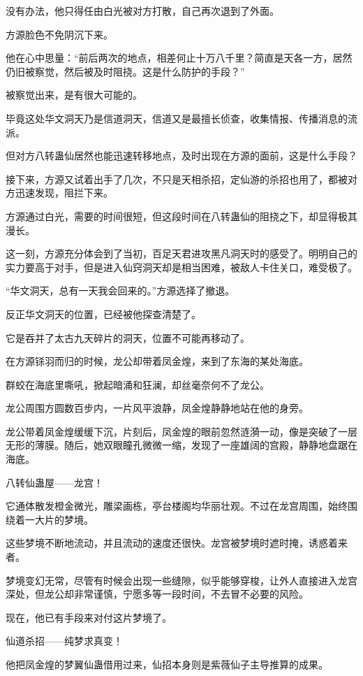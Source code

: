 \begin{this_body}
没有办法，他只得任由白光被对方打散，自己再次退到了外面。

方源脸色不免阴沉下来。

他在心中思量：“前后两次的地点，相差何止十万八千里？简直是天各一方，居然仍旧被察觉，然后被及时阻挠。这是什么防护的手段？”

被察觉出来，是有很大可能的。

毕竟这处华文洞天乃是信道洞天，信道又是最擅长侦查，收集情报、传播消息的流派。

但对方八转蛊仙居然也能迅速转移地点，及时出现在方源的面前，这是什么手段？

接下来，方源又试着出手了几次，不只是天相杀招，定仙游的杀招也用了，都被对方迅速发现，阻拦下来。

方源通过白光，需要的时间很短，但这段时间在八转蛊仙的阻挠之下，却显得极其漫长。

这一刻，方源充分体会到了当初，百足天君进攻黑凡洞天时的感受了。明明自己的实力要高于对手，但是进入仙窍洞天却是相当困难，被敌人卡住关口，难受极了。

“华文洞天，总有一天我会回来的。”方源选择了撤退。

反正华文洞天的位置，已经被他探查清楚了。

它是吞并了太古九天碎片的洞天，位置不可能再移动了。

在方源铩羽而归的时候，龙公却带着凤金煌，来到了东海的某处海底。

群蛟在海底里嘶吼，掀起暗涌和狂澜，却丝毫奈何不了龙公。

龙公周围方圆数百步内，一片风平浪静，凤金煌静静地站在他的身旁。

龙公带着凤金煌缓缓下沉，片刻后，凤金煌的眼前忽然涟漪一动，像是突破了一层无形的薄膜。随后，她双眼瞳孔微微一缩，发现了一座雄阔的宫殿，静静地盘踞在海底。

八转仙蛊屋——龙宫！

它通体散发橙金微光，雕梁画栋，亭台楼阁均华丽壮观。不过在龙宫周围，始终围绕着一大片的梦境。

这些梦境不断地流动，并且流动的速度还很快。龙宫被梦境时遮时掩，诱惑着来者。

梦境变幻无常，尽管有时候会出现一些缝隙，似乎能够穿梭，让外人直接进入龙宫深处，但龙公却非常谨慎，宁愿多等一段时间，不去冒不必要的风险。

现在，他已有手段来对付这片梦境了。

仙道杀招——纯梦求真变！

他把凤金煌的梦翼仙蛊借用过来，仙招本身则是紫薇仙子主导推算的成果。


\end{this_body}
